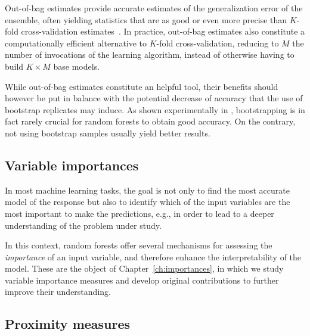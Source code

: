 Out-of-bag estimates provide accurate estimates of the
generalization error of the ensemble, often yielding statistics that are as
good or even more precise than $K$-fold cross-validation
estimates~\citep{wolpert:1999}. In practice, out-of-bag estimates also
constitute a computationally efficient alternative to $K$-fold cross-validation,
reducing to $M$ the number of invocations of the learning
algorithm, instead of otherwise having to build $K\times M$ base models.

While out-of-bag estimates constitute an helpful tool, their benefits should
however be put in balance with the potential decrease of accuracy that the use
of bootstrap replicates may induce. As shown experimentally in
\citep{louppe:2012}, bootstrapping is in fact rarely crucial for random forests
to obtain good accuracy. On the contrary, not using bootstrap samples usually
yield better results.

\subsection{Variable importances}

In most machine learning tasks, the goal is not only to find the most accurate
model of the response but also to identify which of the input variables are the
most important to make the predictions, e.g., in order to lead to a deeper
understanding of the problem under study.

In this context, random forests offer several mechanisms for assessing the
\textit{importance} of an input variable, and therefore enhance the
interpretability of the model. These are the object of
Chapter~\ref{ch:importances}, in which we study variable importance measures
and develop original contributions to further improve their understanding.

\subsection{Proximity measures}

